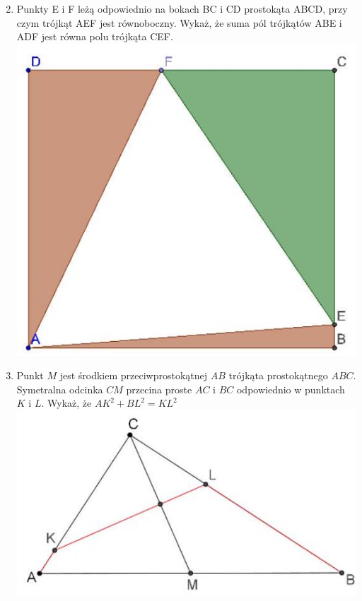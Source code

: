 \documentclass[10pt]{article}
\begin{document}
\begin{enumerate}
  \setcounter{enumi}{1}
  \item Punkty E i F leżą odpowiednio na bokach BC i CD prostokąta ABCD, przy czym trójkąt AEF jest równoboczny. Wykaż, że suma pól trójkątów ABE i ADF jest równa polu trójkąta CEF.\\
\includegraphics[max width=\textwidth, center]{2024_11_21_6cae607e190cc5a22142g-1}
  \item Punkt \(M\) jest środkiem przeciwprostokątnej \(A B\) trójkąta prostokątnego \(A B C\). Symetralna odcinka \(C M\) przecina proste \(A C\) i \(B C\) odpowiednio w punktach \(K\) i \(L\). Wykaż, że \(A K^{2}+B L^{2}=K L^{2}\)\\
\includegraphics[max width=\textwidth, center]{2024_11_21_6cae607e190cc5a22142g-1(1)}
\end{enumerate}
\end{document}

